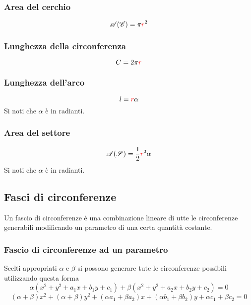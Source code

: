 \subsubsection{Area del cerchio}
\begin{equation*}
  \mathscr{A}(\mathscr{C}) = \pi\mathcolor{red}{r}^2
\end{equation*}

\subsubsection{Lunghezza della circonferenza}
\begin{equation*}
  C = 2\pi\mathcolor{red}{r}
\end{equation*}

\subsubsection{Lunghezza dell'arco}
\begin{equation*}
  l = \mathcolor{red}{r}\alpha
\end{equation*}
Si noti che $\alpha$ è in radianti.

\subsubsection{Area del settore}
\begin{equation*}
  \mathscr{A}(\mathscr{S}) = \frac{1}{2}\mathcolor{red}{r}^2\alpha
\end{equation*}
Si noti che $\alpha$ è in radianti.

\subsection{Fasci di circonferenze}\label{subsec:geomanal:fasciocirc}
Un fascio di circonferenze è una combinazione lineare di utte le circonferenze generabili modificando
un parametro di una certa quantità costante.

\subsubsection{Fascio di circonferenze ad un parametro}
Scelti appropriati $\alpha$ e $\beta$ si possono generare tute le circonferenze possibili utilizzando 
questa forma
\begin{equation*}
  \alpha(x^2+y^2+a_1x+b_1y+c_1) + \beta(x^2+y^2+a_2x+b_2y+c_2) = 0
\end{equation*}
\begin{equation*}
  (\alpha+\beta)x^2+(\alpha+\beta)y^2+(\alpha a_1+\beta a_2)x+(\alpha b_1+\beta b_2)y+
  \alpha c_1+\beta c_2 = 0
\end{equation*}

